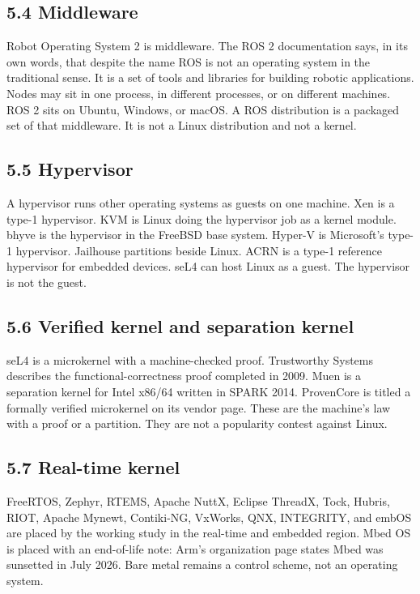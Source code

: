 \documentclass[10pt,letterpaper]{article}
\begin{document}
\subsection{5.4 Middleware}\label{middleware}

Robot Operating System 2 is middleware. The ROS 2 documentation says, in
its own words, that despite the name ROS is not an operating system in
the traditional sense. It is a set of tools and libraries for building
robotic applications. Nodes may sit in one process, in different
processes, or on different machines. ROS 2 sits on Ubuntu, Windows, or
macOS. A ROS distribution is a packaged set of that middleware. It is
not a Linux distribution and not a kernel.

\subsection{5.5 Hypervisor}\label{hypervisor}

A hypervisor runs other operating systems as guests on one machine. Xen
is a type-1 hypervisor. KVM is Linux doing the hypervisor job as a
kernel module. bhyve is the hypervisor in the FreeBSD base system.
Hyper-V is Microsoft's type-1 hypervisor. Jailhouse partitions beside
Linux. ACRN is a type-1 reference hypervisor for embedded devices. seL4
can host Linux as a guest. The hypervisor is not the guest.

\subsection{5.6 Verified kernel and separation
kernel}\label{verified-kernel-and-separation-kernel}

seL4 is a microkernel with a machine-checked proof. Trustworthy Systems
describes the functional-correctness proof completed in 2009. Muen is a
separation kernel for Intel x86/64 written in SPARK 2014. ProvenCore is
titled a formally verified microkernel on its vendor page. These are the
machine's law with a proof or a partition. They are not a popularity
contest against Linux.

\subsection{5.7 Real-time kernel}\label{real-time-kernel}

FreeRTOS, Zephyr, RTEMS, Apache NuttX, Eclipse ThreadX, Tock, Hubris,
RIOT, Apache Mynewt, Contiki-NG, VxWorks, QNX, INTEGRITY, and embOS are
placed by the working study in the real-time and embedded region. Mbed
OS is placed with an end-of-life note: Arm's organization page states
Mbed was sunsetted in July 2026. Bare metal remains a control scheme,
not an operating system.
\end{document}
